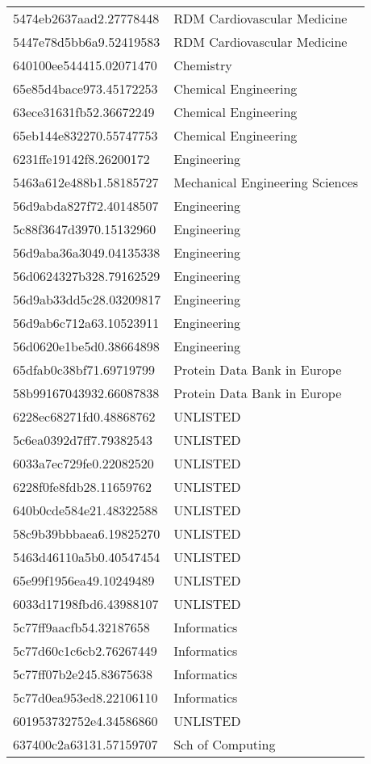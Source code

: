 \begin{tabular}{ll}
5474eb2637aad2.27778448 & RDM Cardiovascular Medicine \\
5447e78d5bb6a9.52419583 & RDM Cardiovascular Medicine \\
640100ee544415.02071470 & Chemistry \\
65e85d4bace973.45172253 & Chemical Engineering \\
63ece31631fb52.36672249 & Chemical Engineering \\
65eb144e832270.55747753 & Chemical Engineering \\
6231ffe19142f8.26200172 & Engineering \\
5463a612e488b1.58185727 & Mechanical Engineering Sciences \\
56d9abda827f72.40148507 & Engineering \\
5c88f3647d3970.15132960 & Engineering \\
56d9aba36a3049.04135338 & Engineering \\
56d0624327b328.79162529 & Engineering \\
56d9ab33dd5c28.03209817 & Engineering \\
56d9ab6c712a63.10523911 & Engineering \\
56d0620e1be5d0.38664898 & Engineering \\
65dfab0c38bf71.69719799 & Protein Data Bank in Europe \\
58b99167043932.66087838 & Protein Data Bank in Europe \\
6228ec68271fd0.48868762 & UNLISTED \\
5c6ea0392d7ff7.79382543 & UNLISTED \\
6033a7ec729fe0.22082520 & UNLISTED \\
6228f0fe8fdb28.11659762 & UNLISTED \\
640b0cde584e21.48322588 & UNLISTED \\
58c9b39bbbaea6.19825270 & UNLISTED \\
5463d46110a5b0.40547454 & UNLISTED \\
65e99f1956ea49.10249489 & UNLISTED \\
6033d17198fbd6.43988107 & UNLISTED \\
5c77ff9aacfb54.32187658 & Informatics \\
5c77d60c1c6cb2.76267449 & Informatics \\
5c77ff07b2e245.83675638 & Informatics \\
5c77d0ea953ed8.22106110 & Informatics \\
601953732752e4.34586860 & UNLISTED \\
637400c2a63131.57159707 & Sch of Computing \\

\end{tabular}
